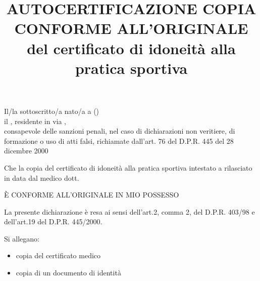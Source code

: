 \documentclass{djtsmod}
\title{AUTOCERTIFICAZIONE COPIA CONFORME ALL'ORIGINALE\\ del certificato di idoneità alla pratica sportiva}
\begin{document}
	\maketitle
	
	Il/la sottoscritto/a \fieldfill\; nato/a a \field{1.5in} (\field{0.5in}) \\ 
	il \field{1.5in}, residente in \field{2in} via \fieldfill, \\
	consapevole delle sanzioni penali, nel caso di dichiarazioni non veritiere, di formazione o uso di atti falsi, richiamate dall'art. 76 del D.P.R. 445 del 28 dicembre 2000
	
	
	Che la copia del certificato di idoneità alla pratica sportiva intestato a \field{3in} rilasciato in data \field{1.5in} dal medico dott. \fieldfill
	
	\begin{center}
		È CONFORME ALL'ORIGINALE IN MIO POSSESSO
	\end{center}
	
	La presente dichiarazione è resa ai sensi dell'art.2, comma 2, del D.P.R. 403/98 e dell'art.19 del D.P.R. 445/2000.
	
	\vspace{1in}
	
	\vspace{1in}
	Si allegano:
	\begin{itemize}
		\item copia del certificato medico
		\item copia di un documento di identità
	\end{itemize}
	
\end{document}
